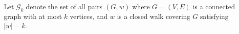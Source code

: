 












\begin{definition}
  \label{def:}
  \notready
  \uses{}
  Let $\mathcal{G}_k$ denote the set of all pairs $(G,w)$ where $G = (V,E)$ is a connected graph with at most $k$ vertices, and
  $w$ is a closed walk covering $G$ satisfying $|w| = k$.
\end{definition}






